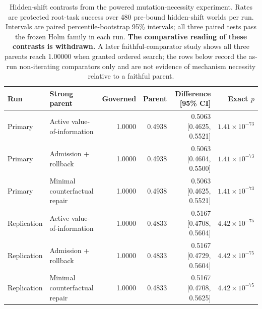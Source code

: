 \begin{table}[htbp]
\centering
\small
\setlength{\tabcolsep}{4pt}
\caption{Hidden-shift contrasts from the powered mutation-necessity experiment. Rates are protected root-task success over 480 pre-bound hidden-shift worlds per run. Intervals are paired percentile-bootstrap 95\% intervals; all three paired tests pass the frozen Holm family in each run. \textbf{The
  comparative reading of these contrasts is withdrawn.} A later faithful-comparator
  study shows all three parents reach 1.00000 when granted ordered search; the rows
  below record the as-run non-iterating comparators only and are not evidence of
  mechanism necessity relative to a faithful parent.}
\label{tab:P1-T4}
\begin{tabular}{llrrrr}
\toprule
Run & Strong parent & Governed & Parent & Difference [95\% CI] & Exact $p$ \\
\midrule
Primary & Active value-of-information & 1.0000 & 0.4938 & 0.5063 [0.4625, 0.5521] & $1.41\times10^{-73}$ \\
Primary & Admission + rollback & 1.0000 & 0.4938 & 0.5063 [0.4604, 0.5500] & $1.41\times10^{-73}$ \\
Primary & Minimal counterfactual repair & 1.0000 & 0.4938 & 0.5063 [0.4625, 0.5521] & $1.41\times10^{-73}$ \\
\midrule
Replication & Active value-of-information & 1.0000 & 0.4833 & 0.5167 [0.4708, 0.5604] & $4.42\times10^{-75}$ \\
Replication & Admission + rollback & 1.0000 & 0.4833 & 0.5167 [0.4729, 0.5604] & $4.42\times10^{-75}$ \\
Replication & Minimal counterfactual repair & 1.0000 & 0.4833 & 0.5167 [0.4708, 0.5625] & $4.42\times10^{-75}$ \\
\bottomrule
\end{tabular}
\end{table}
